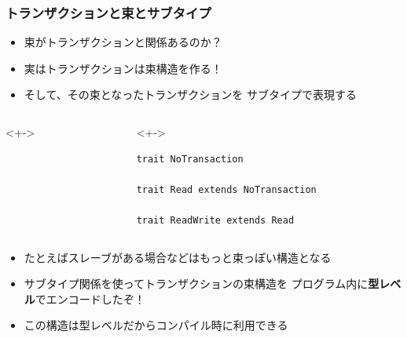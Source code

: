 \begin{frame}[fragile]
  \frametitle{トランザクションと束とサブタイプ}
 
  \begin{itemize}
    \item<+-> 束がトランザクションと関係あるのか？
    \item<+-> 実はトランザクションは束構造を作る！
    \item<+-> そして、その束となったトランザクションを
    サブタイプで表現する
  \end{itemize}

  \begin{columns}
    \begin{column}{0.3\textwidth}
      \begin{center}
        \begin{uncoverenv}<+->
        \end{uncoverenv}
      \end{center}
    \end{column}

    \begin{column}{0.7\textwidth}
      \begin{uncoverenv}<+->
\begin{lstlisting}[style=scala]
trait NoTransaction
 
trait Read extends NoTransaction
 
trait ReadWrite extends Read
\end{lstlisting}
      \end{uncoverenv}
    \end{column}
  \end{columns}

  \begin{itemize}
    \item<+-> たとえばスレーブがある場合などはもっと束っぽい構造となる
    
    \item<+-> サブタイプ関係を使ってトランザクションの束構造を
    プログラム内に\textbf{型レベル}でエンコードしたぞ！

    \item<+-> この構造は型レベルだからコンパイル時に利用できる
  \end{itemize}
\end{frame}
 
